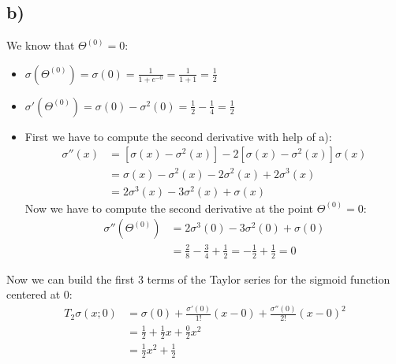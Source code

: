 \documentclass[a4paper]{article}
\begin{document}
    \subsection*{b)}
        We know that $\Theta^{(0)} = 0$:
        \begin{itemize}
            \item $\sigma(\Theta^{(0)}) = \sigma(0)
                = \frac{1}{1+e^{-0}} = \frac{1}{1+1} = \frac{1}{2}$
            \item $\sigma'(\Theta^{(0)})
                = \sigma(0) - \sigma^2(0) = \frac{1}{2}-\frac{1}{4} = \frac{1}{2}$
            \item First we have to compute the second derivative with help of a):
                \begin{align*}
                    \sigma''(x) &= [\sigma(x)-\sigma^2(x)] 
                    - 2[\sigma(x)-\sigma^2(x)] \sigma(x)\\
                    &= \sigma(x) - \sigma^2(x) - 2 \sigma^2(x) + 2\sigma^3(x)\\
                    &= 2\sigma^3(x) - 3\sigma^2(x) + \sigma(x)
                \end{align*}
                Now we have to compute the second derivative at the point $\Theta^{(0)} = 0$:
                \begin{align*}
                    \sigma''(\Theta^{(0)}) &= 2\sigma^3(0)
                    - 3\sigma^2(0) + \sigma(0)\\
                    &= \frac{2}{8} - \frac{3}{4} + \frac{1}{2}
                    = -\frac{1}{2} + \frac{1}{2} = 0
                \end{align*}
        \end{itemize}
        
        Now we can build the first 3 terms of the Taylor series for the sigmoid function centered at $0$:
        \begin{align*}
            T_2 \sigma(x; 0) &= \sigma(0) 
            + \frac{\sigma'(0)}{1!} (x-0)
            + \frac{\sigma''(0)}{2!} (x-0)^2\\
            &= \frac{1}{2} + \frac{1}{2} x + \frac{0}{2} x^2\\
            &= \frac{1}{2} x^2 + \frac{1}{2}
        \end{align*}

\newpage
\end{document}
